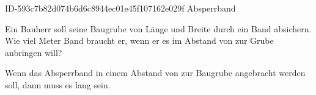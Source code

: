 \begin{exercise}
      {ID-593c7b82d074b6d6c8944ec01e45f107162e029f}
      {Absperrband}
  \ifproblem\problem\par
    Ein Bauherr soll seine Baugrube von  Länge und  Breite
    durch ein Band absichern. Wie viel Meter Band braucht er, wenn er es im
    Abstand von  zur Grube anbringen will?
  \fi
  \ifoutcome\outcome\par
    Wenn das Absperrband in einem Abstand von  zur Baugrube angebracht
    werden soll, dann muss es  lang sein.
  \fi
\end{exercise}
